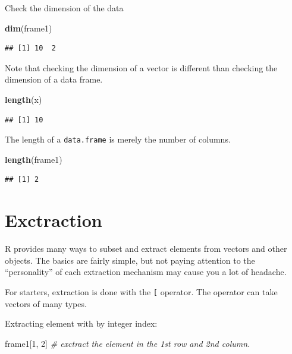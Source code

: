 \documentclass[]{book}
\newenvironment{Shaded}{\begin{snugshade}}{\end{snugshade}}
\newcommand{\KeywordTok}[1]{\textcolor[rgb]{0.13,0.29,0.53}{\textbf{#1}}}
\newcommand{\DecValTok}[1]{\textcolor[rgb]{0.00,0.00,0.81}{#1}}
\newcommand{\CommentTok}[1]{\textcolor[rgb]{0.56,0.35,0.01}{\textit{#1}}}
\newcommand{\NormalTok}[1]{#1}
\theoremstyle{definition}
\theoremstyle{definition}
\theoremstyle{definition}
\theoremstyle{remark}
\begin{document}
Check the dimension of the data

\begin{Shaded}
\begin{Highlighting}[]
\KeywordTok{dim}\NormalTok{(frame1)                             }
\end{Highlighting}
\end{Shaded}

\begin{verbatim}
## [1] 10  2
\end{verbatim}

Note that checking the dimension of a vector is different than checking
the dimension of a data frame.

\begin{Shaded}
\begin{Highlighting}[]
\KeywordTok{length}\NormalTok{(x)}
\end{Highlighting}
\end{Shaded}

\begin{verbatim}
## [1] 10
\end{verbatim}

The length of a \texttt{data.frame} is merely the number of columns.

\begin{Shaded}
\begin{Highlighting}[]
\KeywordTok{length}\NormalTok{(frame1) }
\end{Highlighting}
\end{Shaded}

\begin{verbatim}
## [1] 2
\end{verbatim}

\section{Exctraction}\label{exctraction}

R provides many ways to subset and extract elements from vectors and
other objects. The basics are fairly simple, but not paying attention to
the ``personality'' of each extraction mechanism may cause you a lot of
headache.

For starters, extraction is done with the \texttt{{[}} operator. The
operator can take vectors of many types.

Extracting element with by integer index:

\begin{Shaded}
\begin{Highlighting}[]
\NormalTok{frame1[}\DecValTok{1}\NormalTok{, }\DecValTok{2}\NormalTok{]  }\CommentTok{# exctract the element in the 1st row and 2nd column.}
\end{Highlighting}
\end{Shaded}
\end{document}
